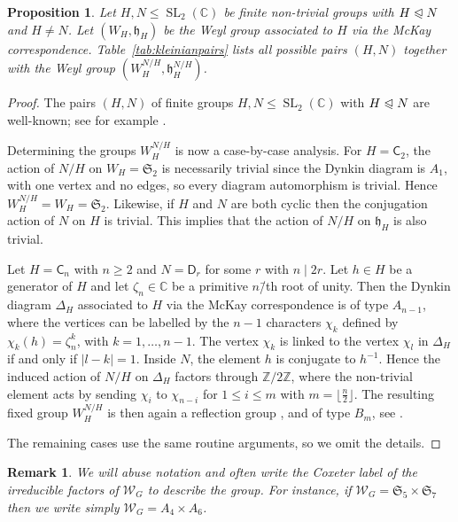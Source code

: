 \documentclass[10pt,a4paper]{amsart}
\newtheorem{proposition}[theorem]{Proposition}
\newtheorem{remark}[theorem]{Remark}
\DeclareMathOperator{\SL}{SL}
\newcommand{\CC}{\mathbb C}
\newcommand{\ZZ}{\mathbb Z}
\begin{document}
\begin{proposition}
  \label{prop:SL2pairs}
  Let \(H, N\leqslant\SL_2(\CC)\) be finite non-trivial groups with \(H\trianglelefteqslant N\) and \(H\neq N\).
  Let \((W_H, \mathfrak h_H)\) be the Weyl group associated to \(H\) via the McKay correspondence.
  Table~\ref{tab:kleinianpairs} lists all possible pairs \((H, N)\) together with the Weyl group \((W_H^{N/H}, \mathfrak h_H^{N/H})\).
\end{proposition}
\begin{proof}
  The pairs \((H, N)\) of finite groups \(H, N\leqslant\SL_2(\CC)\) with \(H\trianglelefteqslant N\) are well-known; see for example \cite[p.~56]{Val64}.

  Determining the groups \(W_H^{N/H}\) is now a case-by-case analysis.
  For \(H = \mathsf C_2\), the action of $N/H$ on $W_H = \mathfrak{S}_2$ is necessarily trivial since the Dynkin diagram is $A_1$, with one vertex and no edges, so every diagram automorphism is trivial. Hence $W_H^{N/H} = W_H = \mathfrak{S}_2$. Likewise, if \(H\) and \(N\) are both cyclic then the conjugation action of $N$ on $H$ is trivial.  This implies that the action of \(N/H\) on \(\mathfrak h_H\) is also trivial.

  Let \(H = \mathsf C_n\) with \(n\geqslant 2\) and \(N = \mathsf D_r\) for some \(r\) with \(n\mid 2r\).
  Let \(h\in H\) be a generator of \(H\) and let \(\zeta_n\in \CC\) be a primitive \(n\)\=/th root of unity.
  Then the Dynkin diagram \(\Delta_H\) associated to \(H\) via the McKay correspondence is of type \(A_{n - 1}\), where the vertices can be labelled by the \(n - 1\) characters \(\chi_k\) defined by \(\chi_k(h) = \zeta_n^k\), with \(k = 1,\dots, n - 1\).
  The vertex \(\chi_k\) is linked to the vertex \(\chi_l\) in \(\Delta_H\) if and only if \(|{l - k}| = 1\).
  Inside \(N\), the element \(h\) is conjugate to \(h^{-1}\).
  Hence the induced action of \(N/H\) on \(\Delta_H\) factors through \(\ZZ/2\ZZ\), where the non-trivial element acts by sending \(\chi_i\) to \(\chi_{n - i}\) for \(1\leqslant i \leqslant m\) with \(m = \lfloor\frac{n}{2}\rfloor\).
  The resulting fixed group \(W_H^{N/H}\) is then again a reflection group \cite[Thm.~32]{Ste68}, \cite{GI14} and of type \(B_m\), see \cite[p.~175, Ex.~(a)]{Ste68}.

  The remaining cases use the same routine arguments, so we omit the details.
\end{proof}

\begin{remark}
	We will abuse notation and often write the Coxeter label of the irreducible factors of $\mathcal{W}_G$ to describe the group. For instance, if $\mathcal{W}_G = \mathfrak{S}_5 \times \mathfrak{S}_7$ then we write simply $\mathcal{W}_G = A_4 \times A_6$. 
\end{remark}
\end{document}
